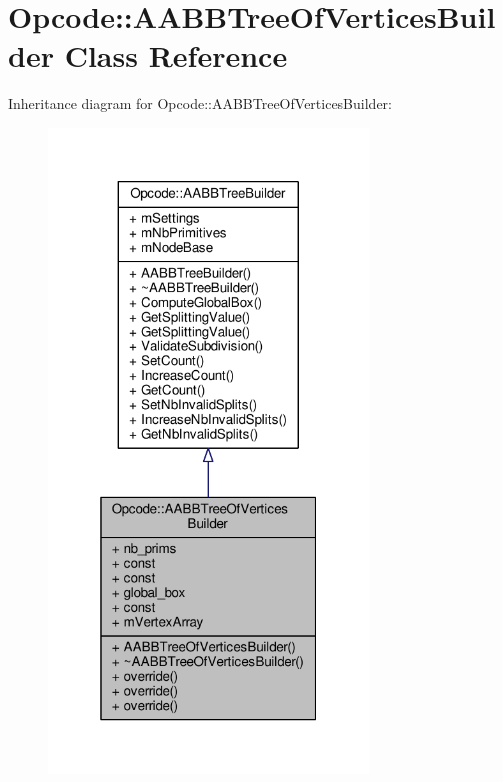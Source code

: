 \hypertarget{classOpcode_1_1AABBTreeOfVerticesBuilder}{}\section{Opcode\+:\+:A\+A\+B\+B\+Tree\+Of\+Vertices\+Builder Class Reference}
\label{classOpcode_1_1AABBTreeOfVerticesBuilder}


Inheritance diagram for Opcode\+:\+:A\+A\+B\+B\+Tree\+Of\+Vertices\+Builder\+:
\nopagebreak
\begin{figure}[H]
\begin{center}
\leavevmode
\includegraphics[width=241pt]{d4/da8/classOpcode_1_1AABBTreeOfVerticesBuilder__inherit__graph}
\end{center}
\end{figure}


